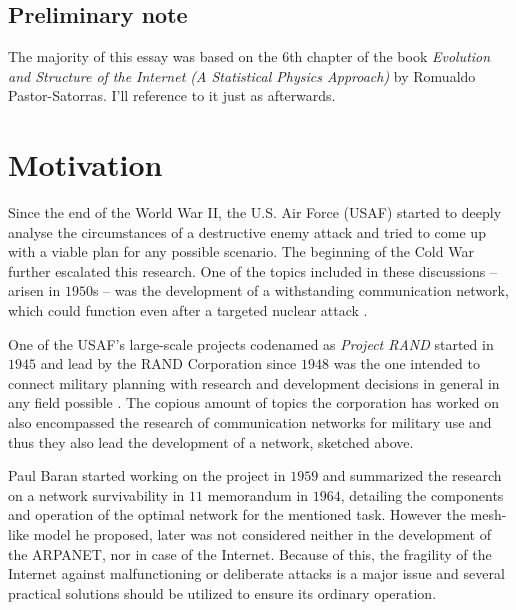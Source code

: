 \subsection*{Preliminary note}
The majority of this essay was based on the $6$th chapter of the book \textit{Evolution and Structure of the Internet (A Statistical Physics Approach)} by Romualdo Pastor-Satorras. I'll reference to it just as  afterwards.

\section{Motivation}
Since the end of the World War II, the U.S. Air Force (USAF) started to deeply analyse the circumstances of a destructive enemy attack and tried to come up with a viable plan for any possible scenario. The beginning of the Cold War further escalated this research. One of the topics included in these discussions -- arisen in $1950$s -- was the development of a withstanding communication network, which could function even after a targeted nuclear attack \citep{baran1964distributed}.

One of the USAF's large-scale projects codenamed as \textit{Project RAND} started in $1945$ and lead by the RAND Corporation since $1948$ was the one intended to connect military planning with research and development decisions in general in any field possible \citep{bawden2005evolution}. The copious amount of topics the corporation has worked on also encompassed the research of communication networks for military use and thus they also lead the development of a  network, sketched above.

Paul Baran started working on the project in $1959$ and summarized the research on a network survivability in $11$ memorandum in $1964$, detailing the components and operation of the optimal network for the mentioned task. However the mesh-like model he proposed, later was not considered neither in the development of the ARPANET, nor in case of the Internet. Because of this, the fragility of the Internet against malfunctioning or deliberate attacks is a major issue and several practical solutions should be utilized to ensure its ordinary operation.

